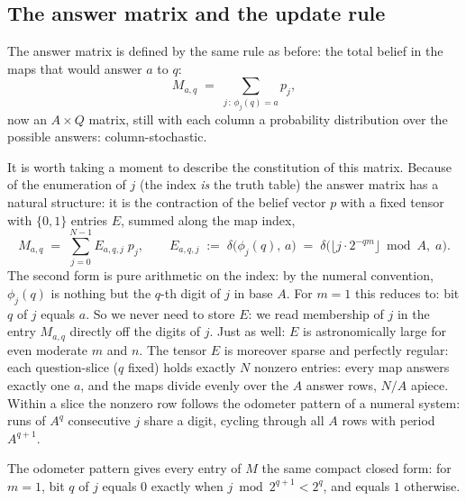 \documentclass[11pt]{article}
\begin{document}
\subsection{The answer matrix and the update rule}

The answer matrix is defined by the same rule as before: the total
belief in the maps that would answer $a$ to $q$:
\begin{equation}\label{eq:M-general}
  M_{a,q} \;=\; \sum_{j\,:\,\phi_j(q) = a} p_j,
\end{equation}
now an $A \times Q$ matrix, still with each column a probability
distribution over the possible answers: column-stochastic.

It is worth taking a moment to describe the constitution of this
matrix. Because of the enumeration of $j$ (the index \emph{is} the
truth table) the answer matrix has a natural structure: it is the
contraction of the belief vector $p$ with a fixed tensor with $\{0,1\}$ entries $E$,
summed along the map index,
\begin{equation}\label{eq:E}
  M_{a,q} \;=\; \sum_{j=0}^{N-1} E_{a,q,j}\; p_j,
  \qquad
  E_{a,q,j} \;:=\; \delta\big(\phi_j(q),\, a\big)
  \;=\; \delta\Big(\big\lfloor j \cdot 2^{-qm} \big\rfloor \bmod A,\;
  a\Big).
\end{equation}
The second form is pure arithmetic on the index: by the
numeral convention, $\phi_j(q)$ is nothing but the $q$-th digit of
$j$ in base $A$. For $m = 1$ this reduces to: bit $q$ of $j$ equals $a$. 
So we never need to store $E$: we read membership of
$j$ in the entry $M_{a,q}$ directly off the digits of $j$. Just as well: $E$ is astronomically large for even moderate $m$ and $n$.
 The tensor
$E$ is moreover sparse and perfectly regular: each question-slice ($q$ fixed)
holds exactly $N$ nonzero entries: every map answers exactly one
$a$, and the maps divide evenly over the $A$ answer rows, $N/A$ apiece.
Within a slice the nonzero row follows the odometer pattern of a
numeral system: runs of $A^{q}$ consecutive $j$ share a digit,
cycling through all $A$ rows with period $A^{q+1}$. 

The odometer pattern gives every entry of $M$ the same compact
closed form: for $m = 1$, bit $q$ of $j$ equals $0$ exactly when
$j \bmod 2^{q+1} < 2^q$, and equals $1$ otherwise.
\end{document}
